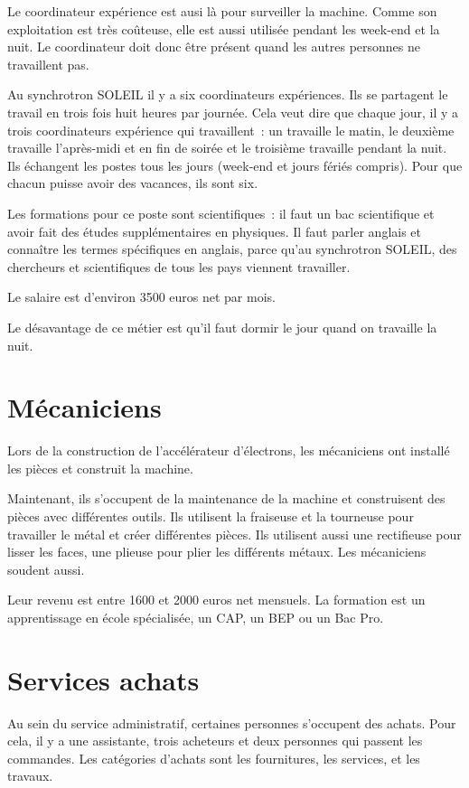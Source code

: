 			Le coordinateur expérience est ausi là pour surveiller la machine. Comme son exploitation est très coûteuse, elle est aussi utilisée  pendant les week-end et la nuit. Le coordinateur doit donc être présent quand les autres personnes ne travaillent pas.
			
			Au synchrotron SOLEIL il y a six coordinateurs expériences. Ils se partagent le travail en trois fois huit heures par journée. Cela veut dire que chaque jour, il y a trois coordinateurs expérience qui travaillent~: un travaille le matin, le deuxième travaille l'après-midi et en fin de soirée et le troisième travaille pendant la nuit. Ils échangent les postes tous les jours (week-end et jours fériés compris). Pour que chacun puisse avoir des vacances, ils sont six.
			
			Les formations pour ce poste sont scientifiques~: il faut un bac scientifique et avoir fait des études supplémentaires en physiques. Il faut parler anglais et connaître les termes spécifiques en anglais, parce qu'au synchrotron SOLEIL, des chercheurs et scientifiques de tous les pays viennent travailler.
			
			Le salaire est d'environ 3500 euros net par mois.

			Le désavantage de ce métier est qu'il faut dormir le jour quand on travaille la nuit. 
		
		\section{Mécaniciens}
			\par Lors de la construction de l'accélérateur d'électrons, les mécaniciens ont installé les pièces et construit la machine. 
			
			\par Maintenant, ils s'occupent de la maintenance de la machine et construisent des pièces avec différentes outils. Ils utilisent la fraiseuse et la tourneuse pour travailler le métal et créer différentes pièces. Ils utilisent aussi une rectifieuse pour lisser les faces, une plieuse pour plier les différents métaux. Les mécaniciens soudent aussi.
			
			\par Leur revenu est entre 1600 et 2000 euros net mensuels. La formation est un apprentissage en école spécialisée, un CAP, un BEP ou un Bac Pro.
		
		\section{Services achats}
			Au sein du service administratif, certaines personnes s'occupent des achats. Pour cela, il y a une assistante, trois acheteurs et deux personnes qui passent les commandes. Les catégories d'achats sont les fournitures, les services, et les travaux.
		
